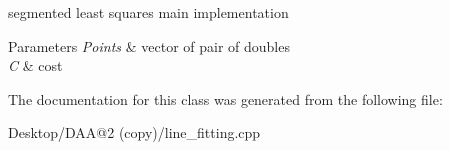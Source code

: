 segmented least squares main implementation 


\begin{DoxyParams}{Parameters}
{\em Points} & vector of pair of doubles \\
\hline
{\em C} & cost \\
\hline
\end{DoxyParams}


The documentation for this class was generated from the following file\+:\begin{DoxyCompactItemize}
\item 
Desktop/\+D\+A\+A@2 (copy)/line\+\_\+fitting.\+cpp\end{DoxyCompactItemize}
